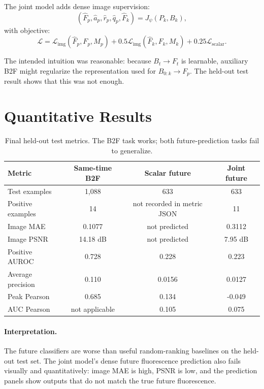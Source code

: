 \documentclass[11pt]{article}
\begin{document}
The joint model adds dense image supervision:
\begin{equation}
(\hat{F}_p,\hat{a}_p,\hat{r}_p,\hat{q}_p,\hat{F}_k)
= J_\psi(P_k, B_k),
\end{equation}
with objective:
\begin{equation}
\mathcal{L}
= \mathcal{L}_{\mathrm{img}}(\hat{F}_p,F_p,M_p)
+0.5\mathcal{L}_{\mathrm{img}}(\hat{F}_k,F_k,M_k)
+0.25\mathcal{L}_{\mathrm{scalar}}.
\end{equation}

The intended intuition was reasonable: because $B_t \rightarrow F_t$ is learnable, auxiliary B2F might regularize the representation used for $B_{0:k} \rightarrow F_p$. The held-out test result shows that this was not enough.

\section{Quantitative Results}

\begin{table}[H]
\centering
\caption{Final held-out test metrics. The B2F task works; both future-prediction tasks fail to generalize.}
\begin{tabular}{lccc}
\toprule
Metric & Same-time B2F & Scalar future & Joint future \\
\midrule
Test examples & 1,088 & 633 & 633 \\
Positive examples & 14 & not recorded in metric JSON & 11 \\
Image MAE & 0.1077 & not predicted & 0.3112 \\
Image PSNR & 14.18 dB & not predicted & 7.95 dB \\
Positive AUROC & 0.728 & 0.228 & 0.223 \\
Average precision & 0.110 & 0.0156 & 0.0127 \\
Peak Pearson & 0.685 & 0.134 & -0.049 \\
AUC Pearson & not applicable & 0.105 & 0.075 \\
\bottomrule
\end{tabular}
\end{table}

\paragraph{Interpretation.}
The future classifiers are worse than useful random-ranking baselines on the held-out test set. The joint model's dense future fluorescence prediction also fails visually and quantitatively: image MAE is high, PSNR is low, and the prediction panels show outputs that do not match the true future fluorescence.
\end{document}
